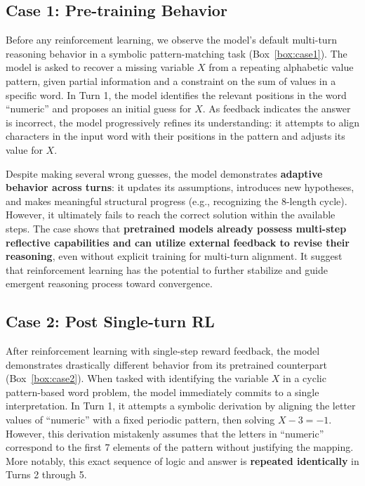 \subsection{Case 1: Pre-training Behavior}
Before any reinforcement learning, we observe the model’s default multi-turn reasoning behavior in a symbolic pattern-matching task (Box~\ref{box:case1}). The model is asked to recover a missing variable \(X\) from a repeating alphabetic value pattern, given partial information and a constraint on the sum of values in a specific word. In Turn 1, the model identifies the relevant positions in the word “numeric” and proposes an initial guess for \(X\). As feedback indicates the answer is incorrect, the model progressively refines its understanding: it attempts to align characters in the input word with their positions in the pattern and adjusts its value for \(X\).

Despite making several wrong guesses, the model demonstrates \textbf{adaptive behavior across turns}: it updates its assumptions, introduces new hypotheses, and makes meaningful structural progress (e.g., recognizing the 8-length cycle). However, it ultimately fails to reach the correct solution within the available steps. The case shows that \textbf{pretrained models already possess multi-step reflective capabilities and can utilize external feedback to revise their reasoning}, even without explicit training for multi-turn alignment. It suggest that reinforcement learning has the potential to further stabilize and guide emergent reasoning process toward convergence.


\subsection{Case 2: Post Single-turn RL}
After reinforcement learning with single-step reward feedback, the model demonstrates drastically different behavior from its pretrained counterpart (Box~\ref{box:case2}). When tasked with identifying the variable \(X\) in a cyclic pattern-based word problem, the model immediately commits to a single interpretation. In Turn 1, it attempts a symbolic derivation by aligning the letter values of “numeric” with a fixed periodic pattern, then solving \(X - 3 = -1\). However, this derivation mistakenly assumes that the letters in “numeric” correspond to the first 7 elements of the pattern without justifying the mapping. More notably, this exact sequence of logic and answer is \textbf{repeated identically} in Turns 2 through 5.

